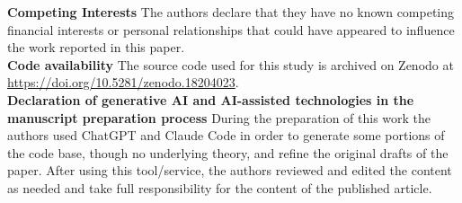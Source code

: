 \documentclass[preprint,12pt]{elsarticle}
\begin{document}
\noindent\textbf{Competing Interests}
\noindent The authors declare that they have no known competing financial interests or personal relationships that could have appeared to influence the work reported in this paper. \\

\noindent\textbf{Code availability}
\noindent The source code used for this study is archived on Zenodo at \url{https://doi.org/10.5281/zenodo.18204023}. \\

\noindent\textbf{Declaration of generative AI and AI-assisted technologies in the manuscript preparation process}
\noindent During the preparation of this work the authors used ChatGPT and Claude Code in order to generate some portions of the code base, though no underlying theory, and refine the original drafts of the paper. After using this tool/service, the authors reviewed and edited the content as needed and take full responsibility for the content of the published article.

 

\end{document}
